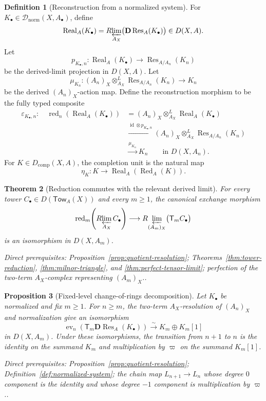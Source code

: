 \documentclass[10pt]{article}
\newtheorem{theorem}{Theorem}[section]
\newtheorem{proposition}[theorem]{Proposition}
\theoremstyle{definition}
\newtheorem{definition}[theorem]{Definition}
\newcommand{\Dnorm}{\mathcal D_{\mathrm{norm}}}
\newcommand{\Rlim}{R\!\varprojlim}
\newcommand{\depends}[1]{\par\smallskip\noindent\textit{Direct prerequisites:} #1.}
\begin{document}
\begin{definition}[Reconstruction from a normalized system]
\label{def:reconstruction}
For $K_\bullet\in\Dnorm(X,A_\bullet)$, define
\[
 \operatorname{Real}_A(K_\bullet)=
 \Rlim_{A_X}\bigl(\mathbf D\operatorname{Res}_A(K_\bullet)\bigr)
 \in D(X,A).
\]
Let
\[
 p_{K_\bullet,n}:\operatorname{Real}_A(K_\bullet)
 \longrightarrow \operatorname{Res}_{A/A_n}(K_n)
\]
be the derived-limit projection in $D(X,A)$.  Let
\[
 \mu_{K_n}:(A_n)_X\otimes^L_{A_X}
 \operatorname{Res}_{A/A_n}(K_n)\longrightarrow K_n
\]
be the derived $(A_n)_X$-action map.  Define the reconstruction morphism to
be the fully typed composite
\[
\begin{aligned}
 \varepsilon_{K_\bullet,n}:\quad
 \operatorname{red}_n(\operatorname{Real}_A(K_\bullet))
 &=(A_n)_X\otimes^L_{A_X}\operatorname{Real}_A(K_\bullet)\\
 &\xrightarrow{\operatorname{id}\otimes p_{K_\bullet,n}}
 (A_n)_X\otimes^L_{A_X}\operatorname{Res}_{A/A_n}(K_n)\\
 &\xrightarrow{\mu_{K_n}}K_n
 \qquad\text{in }D(X,A_n).
\end{aligned}
\]
For $K\in D_{\mathrm{comp}}(X,A)$, the completion unit is the natural map
\[
 \eta_K:K\longrightarrow
 \operatorname{Real}_A(\operatorname{Red}_A(K)).
\]
\end{definition}

\begin{theorem}[Reduction commutes with the relevant derived limit]
\label{thm:reduction-limit}
For every tower $C_\bullet\in D(\mathsf{Tow}_A(X))$ and every $m\geq1$, the
canonical exchange morphism
\[
 \operatorname{red}_m\!\left(\Rlim_{A_X}C_\bullet\right)
 \longrightarrow
 \Rlim_{(A_m)_X}\bigl(\mathsf T_mC_\bullet\bigr)
\]
is an isomorphism in $D(X,A_m)$.
\depends{Proposition~\ref{prop:quotient-resolution};
Theorems~\ref{thm:tower-reduction}, \ref{thm:milnor-triangle}, and
\ref{thm:perfect-tensor-limit}; perfection of the two-term $A_X$-complex
representing $(A_m)_X$.}
\end{theorem}

\begin{proposition}[Fixed-level change-of-rings decomposition]
\label{prop:fixed-level-change-rings}
Let $K_\bullet$ be normalized and fix $m\geq1$.  For $n\geq m$, the
two-term $A_X$-resolution of $(A_n)_X$ and normalization give an isomorphism
\[
 \operatorname{ev}_n\!\left(
   \mathsf T_m\mathbf D\operatorname{Res}_A(K_\bullet)\right)
 \xrightarrow{\sim}K_m\oplus K_m[1]
\]
in $D(X,A_m)$.  Under these isomorphisms, the transition from $n+1$ to $n$
is the identity on the summand $K_m$ and multiplication by $\varpi$ on the
summand $K_m[1]$.
\depends{Proposition~\ref{prop:quotient-resolution};
Definition~\ref{def:normalized-system}; the chain map
$L_{n+1}\to L_n$ whose degree $0$ component is the identity and whose
degree $-1$ component is multiplication by $\varpi$.}
\end{proposition}
\end{document}

